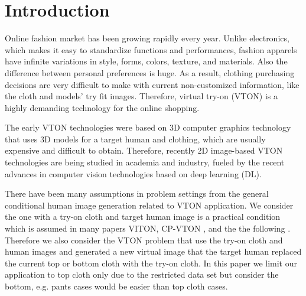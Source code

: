 \section{Introduction}


Online fashion market has been growing rapidly every year. Unlike electronics, which makes it easy to standardize functions and performances, fashion apparels have infinite variations in style, forms, colors, texture, and materials.  Also the difference between personal preferences is huge. As a result, clothing purchasing decisions are very difficult to make with current non-customized information, like the cloth and models' try fit images. Therefore, virtual try-on (VTON) is a highly demanding technology for the online shopping. 

The early VTON technologies were based on 3D computer graphics technology that uses 3D models for a target human and clothing, which are usually expensive and difficult to obtain. Therefore, recently 2D image-based VTON technologies are being studied in academia and industry, fueled by the recent advances in computer vision technologies based on deep learning (DL). 

There have been many assumptions in problem settings from the general conditional human image generation related to VTON application. We consider the one with a try-on cloth and target human image is a practical condition which is assumed in many papers VITON\cite{Han2017VITONAI}, CP-VTON\cite{Wang2018TowardCI} , and the the following  \cite{Sun2019ImageBasedVT,Yu_2019_ICCV}. Therefore we also consider the VTON problem that use the try-on cloth and human images and generated a new virtual image that the target human replaced the current top or bottom cloth with the try-on cloth. In this paper we limit our application to top cloth only due to the restricted data set but consider the bottom, e.g. pants cases would be easier than top cloth cases.

